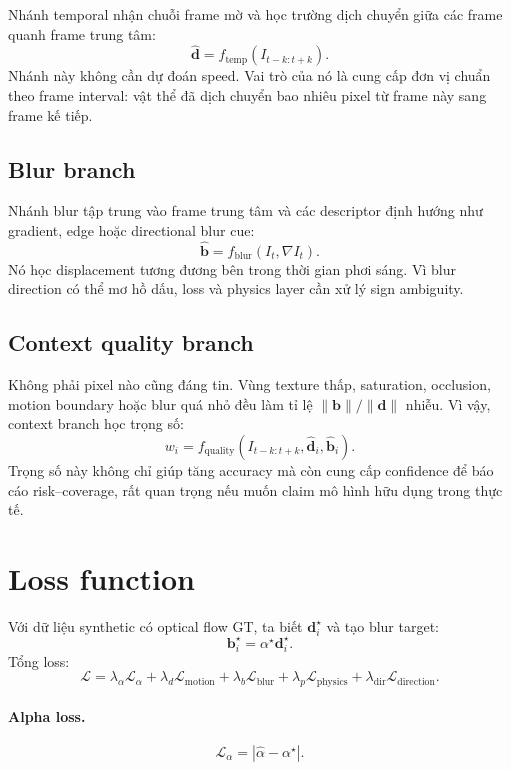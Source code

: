 \documentclass[11pt,a4paper]{article}
\newcommand{\alphagt}{\alpha^{\star}}
\newcommand{\alphahat}{\hat{\alpha}}
\newcommand{\vect}[1]{\mathbf{#1}}
\begin{document}
Nhánh temporal nhận chuỗi frame mờ và học trường dịch chuyển giữa các frame quanh frame trung tâm:
\[
    \hat{\vect d} = f_{\mathrm{temp}}(I_{t-k:t+k}).
\]
Nhánh này không cần dự đoán speed. Vai trò của nó là cung cấp đơn vị chuẩn theo frame interval: vật thể đã dịch chuyển bao nhiêu pixel từ frame này sang frame kế tiếp.

\subsection{Blur branch}

Nhánh blur tập trung vào frame trung tâm và các descriptor định hướng như gradient, edge hoặc directional blur cue:
\[
    \hat{\vect b} = f_{\mathrm{blur}}(I_t, \nabla I_t).
\]
Nó học displacement tương đương bên trong thời gian phơi sáng. Vì blur direction có thể mơ hồ dấu, loss và physics layer cần xử lý sign ambiguity.

\subsection{Context quality branch}

Không phải pixel nào cũng đáng tin. Vùng texture thấp, saturation, occlusion, motion boundary hoặc blur quá nhỏ đều làm tỉ lệ $\|\vect b\|/\|\vect d\|$ nhiễu. Vì vậy, context branch học trọng số:
\[
    w_i = f_{\mathrm{quality}}(I_{t-k:t+k}, \hat{\vect d}_i, \hat{\vect b}_i).
\]
Trọng số này không chỉ giúp tăng accuracy mà còn cung cấp confidence để báo cáo risk--coverage, rất quan trọng nếu muốn claim mô hình hữu dụng trong thực tế.

\section{Loss function}

Với dữ liệu synthetic có optical flow GT, ta biết $\vect d_i^\star$ và tạo blur target:
\[
    \vect b_i^\star = \alphagt \vect d_i^\star.
\]
Tổng loss:
\[
    \mathcal{L}
    =
    \lambda_\alpha \mathcal{L}_\alpha
    + \lambda_d \mathcal{L}_{\mathrm{motion}}
    + \lambda_b \mathcal{L}_{\mathrm{blur}}
    + \lambda_p \mathcal{L}_{\mathrm{physics}}
    + \lambda_{\mathrm{dir}} \mathcal{L}_{\mathrm{direction}}.
\]

\paragraph{Alpha loss.}
\[
    \mathcal{L}_\alpha = |\alphahat - \alphagt|.
\]
\end{document}
